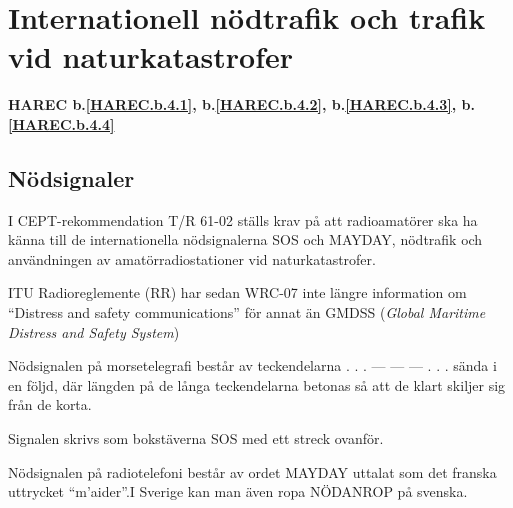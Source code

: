 \section{Internationell nödtrafik och trafik vid naturkatastrofer}
\textbf{
HAREC b.\ref{HAREC.b.4.1}\label{myHAREC.b.4.1},
 b.\ref{HAREC.b.4.2}\label{myHAREC.b.4.2},
 b.\ref{HAREC.b.4.3}\label{myHAREC.b.4.3},
 b.\ref{HAREC.b.4.4}\label{myHAREC.b.4.4}
}

\subsection{Nödsignaler}

I CEPT-rekommendation T/R 61-02 ställs krav på att radioamatörer ska ha känna
till de internationella nödsignalerna SOS och MAYDAY, nödtrafik och användningen
av amatörradiostationer vid naturkatastrofer.

ITU Radioreglemente (RR) har sedan WRC-07 inte längre information om
``Distress and safety communications'' för annat än GMDSS (\emph{Global Maritime Distress and Safety System})

Nödsignalen på morsetelegrafi består av teckendelarna . . . --- --- --- . . .
sända i en följd, där längden på de långa teckendelarna betonas så att de klart
skiljer sig från de korta.

Signalen skrivs som bokstäverna SOS med ett streck ovanför.

Nödsignalen på radiotelefoni består av ordet MAYDAY uttalat som det franska
uttrycket ``m'aider''.I Sverige kan man även ropa NÖDANROP på svenska.

